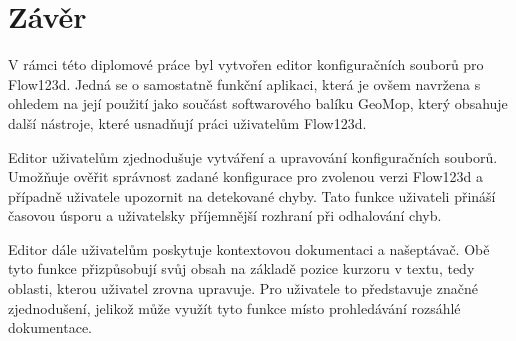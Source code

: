 \documentclass[FM,bw,DP]{tulthesis}
\begin{document}


%
%
%
%
%
%
%
%
%
%
%
%
%
%


\chapter*{Závěr}
V rámci této diplomové práce byl vytvořen editor konfiguračních souborů pro Flow123d. Jedná se o samostatně funkční aplikaci, která je ovšem navržena s ohledem na její použití jako součást softwarového balíku GeoMop, který obsahuje další nástroje, které usnadňují práci uživatelům Flow123d.

Editor uživatelům zjednodušuje vytváření a upravování konfiguračních souborů. Umožňuje ověřit správnost zadané konfigurace pro zvolenou verzi Flow123d a případně uživatele upozornit na detekované chyby. Tato funkce uživateli přináší časovou úsporu a uživatelsky příjemnější rozhraní při odhalování chyb.

Editor dále uživatelům poskytuje kontextovou dokumentaci a našeptávač. Obě tyto funkce přizpůsobují svůj obsah na základě pozice kurzoru v textu, tedy oblasti, kterou uživatel zrovna upravuje. Pro uživatele to představuje značné zjednodušení, jelikož může využít tyto funkce místo prohledávání rozsáhlé dokumentace.
\end{document}
